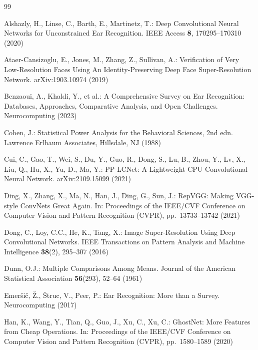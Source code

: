 \documentclass[11pt]{article}
\begin{document}
\begin{thebibliography}{99}

Alshazly, H., Linse, C., Barth, E., Martinetz, T.:
Deep Convolutional Neural Networks for Unconstrained Ear Recognition.
IEEE Access \textbf{8}, 170295--170310 (2020)

Ataer-Cansizoglu, E., Jones, M., Zhang, Z., Sullivan, A.:
Verification of Very Low-Resolution Faces Using An Identity-Preserving Deep Face Super-Resolution Network.
arXiv:1903.10974 (2019)

Benzaoui, A., Khaldi, Y., et al.:
A Comprehensive Survey on Ear Recognition: Databases, Approaches, Comparative Analysis, and Open Challenges.
Neurocomputing (2023)

Cohen, J.:
Statistical Power Analysis for the Behavioral Sciences, 2nd edn.
Lawrence Erlbaum Associates, Hillsdale, NJ (1988)

Cui, C., Gao, T., Wei, S., Du, Y., Guo, R., Dong, S., Lu, B., Zhou, Y., Lv, X., Liu, Q., Hu, X., Yu, D., Ma, Y.:
PP-LCNet: A Lightweight CPU Convolutional Neural Network.
arXiv:2109.15099 (2021)

Ding, X., Zhang, X., Ma, N., Han, J., Ding, G., Sun, J.:
RepVGG: Making VGG-style ConvNets Great Again.
In: Proceedings of the IEEE/CVF Conference on Computer Vision and Pattern Recognition (CVPR), pp.\ 13733--13742 (2021)

Dong, C., Loy, C.C., He, K., Tang, X.:
Image Super-Resolution Using Deep Convolutional Networks.
IEEE Transactions on Pattern Analysis and Machine Intelligence \textbf{38}(2), 295--307 (2016)

Dunn, O.J.:
Multiple Comparisons Among Means.
Journal of the American Statistical Association \textbf{56}(293), 52--64 (1961)

Emeršič, Ž., Štruc, V., Peer, P.:
Ear Recognition: More than a Survey.
Neurocomputing (2017)

Han, K., Wang, Y., Tian, Q., Guo, J., Xu, C., Xu, C.:
GhostNet: More Features from Cheap Operations.
In: Proceedings of the IEEE/CVF Conference on Computer Vision and Pattern Recognition (CVPR), pp.\ 1580--1589 (2020)


\end{thebibliography}
\end{document}
